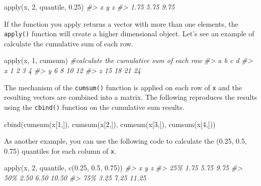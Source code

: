 \documentclass[
]{book}
\newenvironment{Shaded}{\begin{snugshade}}{\end{snugshade}}
\newcommand{\CommentTok}[1]{\textcolor[rgb]{0.56,0.35,0.01}{\textit{#1}}}
\newcommand{\DecValTok}[1]{\textcolor[rgb]{0.00,0.00,0.81}{#1}}
\newcommand{\FloatTok}[1]{\textcolor[rgb]{0.00,0.00,0.81}{#1}}
\newcommand{\FunctionTok}[1]{\textcolor[rgb]{0.00,0.00,0.00}{#1}}
\newcommand{\NormalTok}[1]{#1}
\begin{document}
\begin{Shaded}
\begin{Highlighting}[]
\FunctionTok{apply}\NormalTok{(x, }\DecValTok{2}\NormalTok{, quantile, }\FloatTok{0.25}\NormalTok{)}
\CommentTok{\#\textgreater{}    x    y    z }
\CommentTok{\#\textgreater{} 1.75 5.75 9.75}
\end{Highlighting}
\end{Shaded}

If the function you apply returns a vector with more than one elements, the \texttt{apply()} function will create a higher dimensional object. Let's see an example of calculate the cumulative sum of each row.

\begin{Shaded}
\begin{Highlighting}[]
\FunctionTok{apply}\NormalTok{(x, }\DecValTok{1}\NormalTok{, cumsum) }\CommentTok{\#calculate the cumulative sum of each row}
\CommentTok{\#\textgreater{}    a  b  c  d}
\CommentTok{\#\textgreater{} x  1  2  3  4}
\CommentTok{\#\textgreater{} y  6  8 10 12}
\CommentTok{\#\textgreater{} z 15 18 21 24}
\end{Highlighting}
\end{Shaded}

The mechanism of the \texttt{cumsum()} function is applied on each row of \texttt{x} and the resulting vectors are combined into a matrix. The following reproduces the results using the \texttt{cbind()} function on the cumulative sum results.

\begin{Shaded}
\begin{Highlighting}[]
\FunctionTok{cbind}\NormalTok{(}\FunctionTok{cumsum}\NormalTok{(x[}\DecValTok{1}\NormalTok{,]), }\FunctionTok{cumsum}\NormalTok{(x[}\DecValTok{2}\NormalTok{,]), }\FunctionTok{cumsum}\NormalTok{(x[}\DecValTok{3}\NormalTok{,]), }\FunctionTok{cumsum}\NormalTok{(x[}\DecValTok{4}\NormalTok{,]))}
\end{Highlighting}
\end{Shaded}

As another example, you can use the following code to calculate the (0.25, 0.5, 0.75) quantiles for each column of \texttt{x}.

\begin{Shaded}
\begin{Highlighting}[]
\FunctionTok{apply}\NormalTok{(x, }\DecValTok{2}\NormalTok{, quantile, }\FunctionTok{c}\NormalTok{(}\FloatTok{0.25}\NormalTok{, }\FloatTok{0.5}\NormalTok{, }\FloatTok{0.75}\NormalTok{))}
\CommentTok{\#\textgreater{}        x    y     z}
\CommentTok{\#\textgreater{} 25\% 1.75 5.75  9.75}
\CommentTok{\#\textgreater{} 50\% 2.50 6.50 10.50}
\CommentTok{\#\textgreater{} 75\% 3.25 7.25 11.25}
\end{Highlighting}
\end{Shaded}
\end{document}
